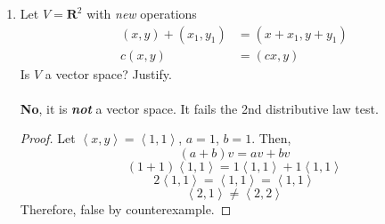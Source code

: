 \documentclass[12pt]{article}
\newcommand{\Rb}{\mathbf{R}}
\renewcommand{\vector}[1]{\left\langle{#1}\right\rangle}
\begin{document}
\begin{enumerate}
\begin{proof} Write the vectors in the column space of a matrix augmented with the identity.
   $$\left[
  \begin{matrix}
    1 & 0 & 1 \\
    0 & 1 & 1 \\
    -1 & 1 & 1 \\
  \end{matrix}
  \left|
    \,
    \begin{matrix}
      1 & 0 & 0  \\
      0 & 1 & 0  \\
      0 & 0 & 1  \\
    \end{matrix}
  \right.
\right]$$
Then, row reduce into the form
   $$\left[
  \begin{matrix}
      1 & 0 & 0  \\
      0 & 1 & 0  \\
      0 & 0 & 1  \\
  \end{matrix}
  \left|
    \,
    \begin{matrix}
      0 & 1 & -1  \\
      -1 & 2 & -1  \\
      1 & -1 & 1  \\
    \end{matrix}
  \right.
\right]$$
Which is $I_3$, thus the vectors are linearly independent. A list of $n$ linearly independent vectors in $\Rb^n$ span $\Rb^n$, thus these vectors span all of $\Rb^3$. Further, \textit{every} vector in $\Rb^3$ is a linear combination of $(1,0,-1), (0,1,1), \text{and}\, (1,1,1)$
\end{proof}
\item Let $V = \mathbf{R}^2$ with \emph{new} operations
\begin{align*}
    (x,y)+(x_1,y_1) &= (x+x_1,y+y_1) \\
    c(x,y) &=(cx,y)
\end{align*}
Is $V$ a vector space?  Justify.\\\\
\textbf{No}, it is \textbf{\textit{not}} a vector space. It fails the 2nd distributive law test. 
\begin{proof}
    Let $\vector{x,y} = \vector{1,1}$, $a = 1$, $b = 1$.
    Then,
    $$(a+b)v = av + bv$$
    $$(1+1)\vector{1,1} = 1\vector{1,1} + 1\vector{1,1}$$
    $$2\vector{1,1} = \vector{1,1} = \vector{1,1}$$
    $$\vector{2,1} \not= \vector{2,2}$$
    Therefore, false by counterexample.

\end{proof}
\end{enumerate}
\end{document}
